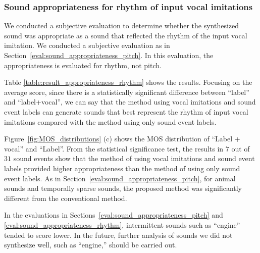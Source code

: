 \documentclass{article}
\begin{document}
\vspace{-3pt}
\subsubsection{Sound appropriateness for rhythm of input vocal imitations}
\vspace{-3pt}
\label{eval:sound_appropriateness_rhythm}
We conducted a subjective evaluation to determine whether the synthesized sound was appropriate as a sound that reflected the rhythm of the input vocal imitation.
We conducted a subjective evaluation as in Section~\ref{eval:sound_appropriateness_pitch}.
In this evaluation, the appropriateness is evaluated for rhythm, not pitch.

Table \ref{table:result_appropriateness_rhythm} shows the results.
Focusing on the average score, since there is a statistically significant difference between ``label'' and ``label+vocal'', we can say that the method using vocal imitations and sound event labels can generate sounds that best represent the rhythm of input vocal imitations compared with the method using only sound event labels.

Figure~\ref{fig:MOS_distributions} (c) shows the MOS distribution of ``Label + vocal'' and ``Label''.
From the statistical significance test, the results in $7$ out of $31$ sound events show that the method of using vocal imitations and sound event labels provided higher appropriateness than the method of using only sound event labels.
As in Section~\ref{eval:sound_appropriateness_pitch}, for animal sounds and temporally sparse sounds, the proposed method was significantly different from the conventional method.

In the evaluations in Sections~\ref{eval:sound_appropriateness_pitch} and \ref{eval:sound_appropriateness_rhythm}, intermittent sounds such as ``engine'' tended to score lower.
In the future, further analysis of sounds we did not synthesize well, such as ``engine,'' should be carried out.
\end{document}
